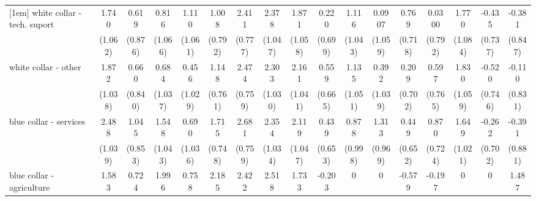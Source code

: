 {\begin{tabular}{l*{16}{c}}
[1em]
white collar - tech. suport&       1.740         &       0.619         &       0.816         &       1.110         &       1.008         &       2.411\sym{**} &       2.378\sym{*}  &       1.871         &       0.220         &       1.116         &      0.0907         &       0.769         &      0.0300         &       1.770         &      -0.435         &      -0.381         \\
                    &     (1.062)         &     (0.876)         &     (1.066)         &     (1.061)         &     (0.792)         &     (0.777)         &     (1.047)         &     (1.058)         &     (0.699)         &     (1.043)         &     (1.059)         &     (0.718)         &     (0.792)         &     (1.084)         &     (0.737)         &     (0.847)         \\
[1em]
white collar - other&       1.872         &       0.660         &       0.684         &       0.456         &       1.148         &       2.474\sym{**} &       2.303\sym{*}  &       2.161\sym{*}  &       0.559         &       1.135         &       0.392         &       0.209         &       0.597         &       1.830         &      -0.520         &      -0.110         \\
                    &     (1.038)         &     (0.840)         &     (1.037)         &     (1.029)         &     (0.761)         &     (0.759)         &     (1.030)         &     (1.041)         &     (0.665)         &     (1.051)         &     (1.039)         &     (0.702)         &     (0.765)         &     (1.059)         &     (0.746)         &     (0.831)         \\
[1em]
blue collar - services&       2.488\sym{*}  &       1.045         &       1.548         &       0.690         &       1.715\sym{*}  &       2.681\sym{***}&       2.354\sym{*}  &       2.119\sym{*}  &       0.439         &       0.878         &       1.313         &       0.449         &       0.870         &       1.649         &      -0.262         &      -0.391         \\
                    &     (1.039)         &     (0.853)         &     (1.043)         &     (1.036)         &     (0.748)         &     (0.759)         &     (1.034)         &     (1.047)         &     (0.653)         &     (0.998)         &     (0.969)         &     (0.652)         &     (0.724)         &     (1.021)         &     (0.702)         &     (0.881)         \\
[1em]
blue collar - agriculture&       1.583         &       0.724         &       1.996         &       0.758         &       2.185         &       2.422\sym{*}  &       2.518         &       1.733         &      -0.203         &           0         &           0         &      -0.579         &      -0.197         &           0         &           0         &       1.487         \\

\end{tabular}}
